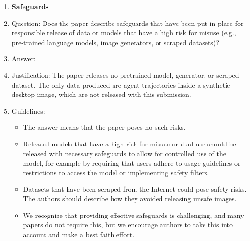 \begin{enumerate}
\item {\bf Safeguards}
    \item[] Question: Does the paper describe safeguards that have been put in place for responsible release of data or models that have a high risk for misuse (e.g., pre-trained language models, image generators, or scraped datasets)?
    \item[] Answer: \answerNA{}
    \item[] Justification: The paper releases no pretrained model, generator, or scraped dataset. The only data produced are agent trajectories inside a synthetic desktop image, which are not released with this submission.
    \item[] Guidelines:
    \begin{itemize}
        \item The answer \answerNA{} means that the paper poses no such risks.
        \item Released models that have a high risk for misuse or dual-use should be released with necessary safeguards to allow for controlled use of the model, for example by requiring that users adhere to usage guidelines or restrictions to access the model or implementing safety filters. 
        \item Datasets that have been scraped from the Internet could pose safety risks. The authors should describe how they avoided releasing unsafe images.
        \item We recognize that providing effective safeguards is challenging, and many papers do not require this, but we encourage authors to take this into account and make a best faith effort.
    \end{itemize}


\end{enumerate}
